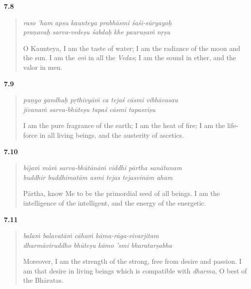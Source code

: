 \par\noindent\textbf{7.8}\par
\begin{verse}
\textit{raso ’ham apsu kaunteya prabhāsmi śaśi-sūryayoḥ} \\
\textit{praṇavaḥ sarva-vedeṣu śabdaḥ khe pauruṣaṁ nṛṣu}

\noindent O Kaunteya, I am the taste of water; I am the radiance of the moon and the sun. I am the \textit{oṁ} in all the \textit{Vedas}; I am the sound in ether, and the valor in men.
\end{verse}
\par



\par\noindent\textbf{7.9}\par
\begin{verse}
\textit{puṇyo gandhaḥ pṛthivyāṁ ca tejaś cāsmi vibhāvasau} \\
\textit{jīvanaṁ sarva-bhūteṣu tapaś cāsmi tapasviṣu}

\noindent I am the pure fragrance of the earth; I am the heat of fire; I am the life-force in all living beings, and the austerity of ascetics.
\end{verse}
\par



\par\noindent\textbf{7.10}\par
\begin{verse}
\textit{bījaṁ māṁ sarva-bhūtānāṁ viddhi pārtha sanātanam} \\
\textit{buddhir buddhimatām asmi tejas tejasvinām aham}

\noindent Pārtha, know Me to be the primordial seed of all beings. I am the intelligence of the intelligent, and the energy of the energetic.
\end{verse}
\par



\par\noindent\textbf{7.11}\par
\begin{verse}
\textit{balaṁ balavatāṁ cāhaṁ kāma-rāga-vivarjitam} \\
\textit{dharmāviruddho bhūteṣu kāmo ’smi bharatarṣabha}

\noindent Moreover, I am the strength of the strong, free from desire and passion. I am that desire in living beings which is compatible with \textit{dharma}, O best of the Bhāratas.
\end{verse}
\par




